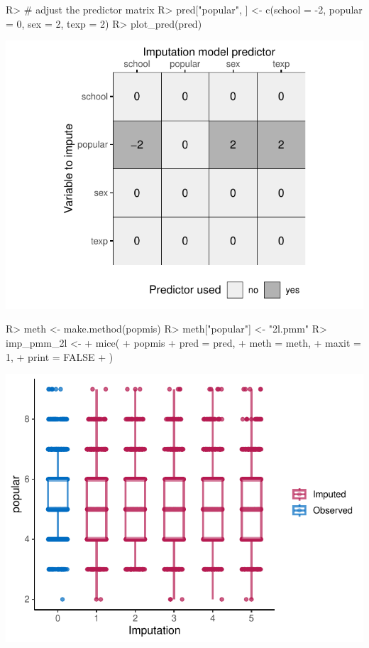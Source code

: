 \documentclass[
]{jss}
\begin{document}
\begin{CodeChunk}
\begin{CodeInput}
R> # adjust the predictor matrix
R> pred["popular", ] <- c(school = -2, popular = 0, sex = 2, texp = 2) 
R> plot_pred(pred) 
\end{CodeInput}


\begin{center}\includegraphics{Imputation_of_Incomplete_Multilevel_Data_files/figure-latex/pop_norm-1} \end{center}

\begin{CodeInput}
R> meth <- make.method(popmis)
R> meth["popular"] <- "2l.pmm"
R> imp_pmm_2l <-
+   mice(
+     popmis %
+     pred = pred,
+     meth = meth,
+     maxit = 1,
+     print = FALSE
+   )
\end{CodeInput}
\end{CodeChunk}

\begin{CodeChunk}


\begin{center}\includegraphics{Imputation_of_Incomplete_Multilevel_Data_files/figure-latex/pop_norm_eval-1} \end{center}

\end{CodeChunk}
\end{document}
